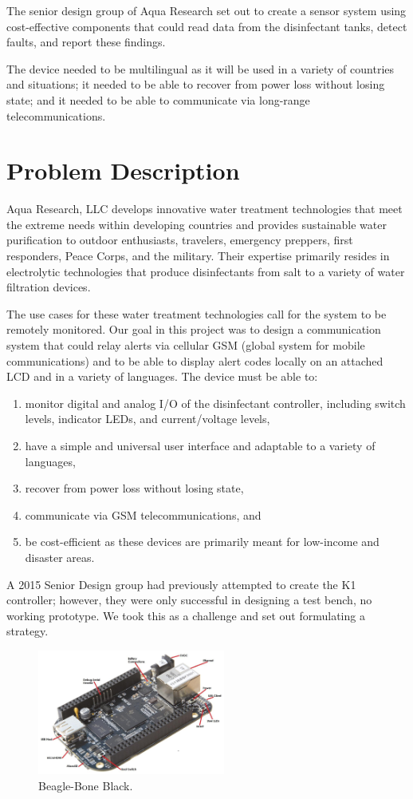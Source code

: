 \documentclass[12pt]{article}
\begin{document}
\noindent The senior design group of Aqua Research set out to create a sensor system using cost-effective components that could read data from the disinfectant tanks, detect faults, and report these findings.

\noindent The device needed to be multilingual as it will be used in a variety of countries and situations; it needed to be able to recover from power loss without losing state; and it needed to be able to communicate via long-range telecommunications.

\section{Problem Description}
Aqua Research, LLC develops innovative water treatment technologies that meet the extreme needs within developing countries and provides sustainable water purification to outdoor enthusiasts, travelers, emergency preppers, first responders, Peace Corps, and the military. Their expertise primarily resides in electrolytic technologies that produce disinfectants from salt to a variety of water filtration devices.

\noindent The use cases for these water treatment technologies call for the system to be remotely monitored. Our goal in this project was to design a communication system that could relay alerts via cellular GSM (global system for mobile communications) and to be able to display alert codes locally on an attached LCD and in a variety of languages. The device must be able to:
\begin{enumerate}
    \item monitor digital and analog I/O of the disinfectant controller, including switch levels, indicator LEDs, and current/voltage levels,
    \item have a simple and universal user interface and adaptable to a variety of languages,
    \item recover from power loss without losing state,
    \item communicate via GSM telecommunications, and
    \item be cost-efficient as these devices are primarily meant for low-income and disaster areas.
\end{enumerate}
\noindent A 2015 Senior Design group had previously attempted to create the K1 controller; however, they were only successful in designing a test bench, no working prototype. We took this as a challenge and set out formulating a strategy.
\begin{figure}[h!]
    \centering
    \includegraphics[width=0.55\textwidth]{BBB-Diagram.jpg}
    \caption{Beagle-Bone Black.}
    \label{fig:BeagleBoneBlack}
\end{figure}
\end{document}
